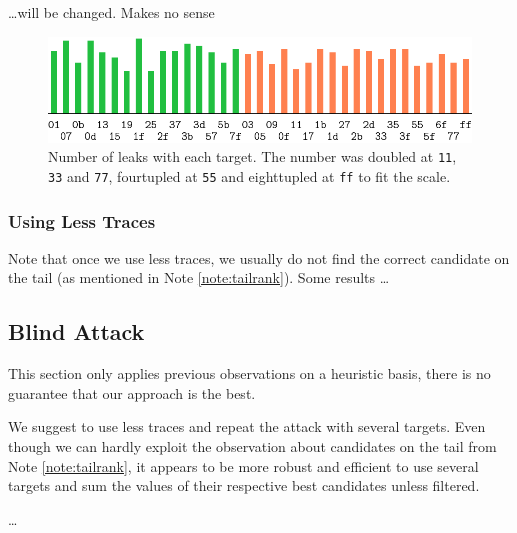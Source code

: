 	\ldots will be changed. Makes no sense
	
	\begin{figure}[h]
	\begin{center}
		\includegraphics{figures/leak_target/plot.pdf}
		\caption{Number of leaks with each target. The number was doubled at {\tt 11}, {\tt 33} and {\tt 77}, fourtupled at {\tt 55} and eighttupled at {\tt ff} to fit the scale.}
		\label{fig:leaktargethist}
	\end{center}
	\end{figure}

\subsubsection{Using Less Traces}
	
	Note that once we use less traces, we usually do not find the correct candidate on the tail (as mentioned in Note \ref{note:tailrank}). Some results \ldots %



\subsection{Blind Attack}
\label{sec:subblindattack}

\begin{note}
	This section only applies previous observations on a heuristic basis, there is no guarantee that our approach is the best.
\end{note}

We suggest to use less traces and repeat the attack with several targets. Even though we can hardly exploit the observation about candidates on the tail from Note \ref{note:tailrank}, it appears to be more robust and efficient to use several targets and sum the values of their respective best candidates unless filtered.

\ldots


